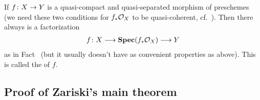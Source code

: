 \documentclass[a4paper,parskip=half,numbers=enddot, DIV=12]{scrreprt}
\begin{document}
\begin{rem}
	If $f\colon X\morphism Y$ is a quasi-compact and quasi-separated morphism of preschemes (we need these two conditions for $f_*\mathcal{O}_X$ to be quasi-coherent, cf.\ \cite[Proposition~1.5.2]{alggeo1}). Then there always is a factorization
	\begin{align*}
		f\colon X\morphism\SPEC(f_*\Oo_X)\morphism Y
	\end{align*}
	as in Fact~ (but it usually doesn't have as convenient properties as above). This is called the  of $f$.
\end{rem}
\subsection{Proof of Zariski's main theorem}
\label{subsec:discussionOfThm3}
\end{document}

